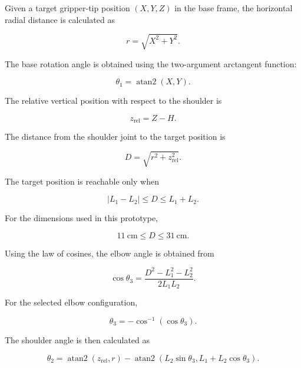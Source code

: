 Given a target gripper-tip position $(X,Y,Z)$ in the base frame, the horizontal radial distance is calculated as

\begin{equation}
r = \sqrt{X^2+Y^2}.
\label{eq:ik_r}
\end{equation}

The base rotation angle is obtained using the two-argument arctangent function:

\begin{equation}
\theta_1 = \operatorname{atan2}(X,Y).
\label{eq:ik_theta1}
\end{equation}

The relative vertical position with respect to the shoulder is

\begin{equation}
z_{\mathrm{rel}} = Z-H.
\label{eq:ik_zrel}
\end{equation}

The distance from the shoulder joint to the target position is

\begin{equation}
D = \sqrt{r^2+z_{\mathrm{rel}}^2}.
\label{eq:ik_d}
\end{equation}

The target position is reachable only when

\begin{equation}
|L_1-L_2| \leq D \leq L_1+L_2.
\label{eq:reachability}
\end{equation}

For the dimensions used in this prototype,

\begin{equation}
11~\mathrm{cm} \leq D \leq 31~\mathrm{cm}.
\label{eq:reachability_values}
\end{equation}

Using the law of cosines, the elbow angle is obtained from

\begin{equation}
\cos\theta_3 =
\frac{D^2-L_1^2-L_2^2}
{2L_1L_2}.
\label{eq:cos_theta3}
\end{equation}

For the selected elbow configuration,

\begin{equation}
\theta_3 =
-\cos^{-1}(\cos\theta_3).
\label{eq:theta3}
\end{equation}

The shoulder angle is then calculated as

\begin{equation}
\theta_2 =
\operatorname{atan2}(z_{\mathrm{rel}},r)
-
\operatorname{atan2}
\left(
L_2\sin\theta_3,
L_1+L_2\cos\theta_3
\right).
\label{eq:theta2}
\end{equation}

